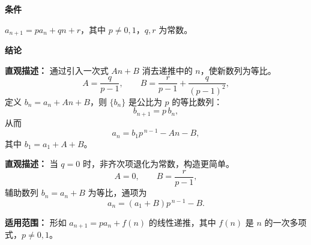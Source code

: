 \begin{statementbox}
	\textbf{\textcolor{CStatement}{条件}}
	\begin{description}[style=nextline, leftmargin=2.8em, labelsep=0.5em, itemsep=0.35em]
		\item[\textbf{\textcolor{CStatement}{条件 1（递推形式）：}}]
			$a_{n+1}=p a_n+q n+r$，其中 $p\neq0,1$，$q,r$ 为常数。
	\end{description}

	\textbf{\textcolor{CStatement}{结论}}
	\begin{description}[style=nextline, leftmargin=2.8em, labelsep=0.5em, itemsep=0.45em]
		\item[\textbf{\textcolor{CStatement}{结论一（等比构造法）：}}]
			\textbf{\textcolor{CStatement}{直观描述：}}
			通过引入一次式 $An+B$ 消去递推中的 $n$，使新数列为等比。
			\[
				A=\frac{q}{p-1},
				\qquad
				B=\frac{r}{p-1}+\frac{q}{(p-1)^2},
			\]
			定义 $b_n=a_n+An+B$，则 $\{b_n\}$ 是公比为 $p$ 的等比数列：
			\[
				b_{n+1}=p\,b_n,
			\]
			从而
			\[
				a_n=b_1 p^{\,n-1}-An-B,
			\]
			其中 $b_1=a_1+A+B$。

		\item[\textbf{\textcolor{CStatement}{常见变形（常数非齐次）：}}]
			\textbf{\textcolor{CStatement}{直观描述：}}
			当 $q=0$ 时，非齐次项退化为常数，构造更简单。
			\[
				A=0,
				\qquad
				B=\frac{r}{p-1},
			\]
			辅助数列 $b_n=a_n+B$ 为等比，通项为
			\[
				a_n = (a_1+B)p^{\,n-1}-B.
			\]
	\end{description}

	\textbf{\textcolor{CStatement}{适用范围：}}
	形如 $a_{n+1}=p a_n+f(n)$ 的线性递推，其中 $f(n)$ 是 $n$ 的一次多项式，$p\neq0,1$。
\end{statementbox}
